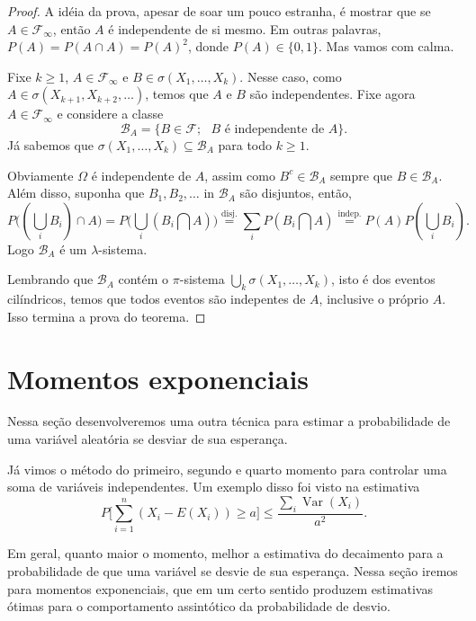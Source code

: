 \documentclass[reqno]{article}
\newcommand*\1{\mathds{1}}
\DeclareMathOperator{\Var}{Var}
\newcommand{\mcup}{\textstyle \bigcup\limits}
\newcommand{\mcap}{\textstyle \bigcap\limits}
\begin{document}
\begin{proof}
  A idéia da prova, apesar de soar um pouco estranha, é mostrar que se $A \in \mathcal{F}_\infty$, então $A$ é independente de si mesmo.
  Em outras palavras, $P(A) = P(A \cap A) = P(A)^2$, donde $P(A) \in \{0,1\}$.
  Mas vamos com calma.

  Fixe $k \geq 1$, $A \in \mathcal{F}_\infty$ e $B \in \sigma(X_1, \dots, X_k)$.
  Nesse caso, como $A \in \sigma(X_{k+1}, X_{k+2}, \dots)$, temos que $A$ e $B$ são independentes.
  Fixe agora $A \in \mathcal{F}_\infty$ e considere a classe
  \begin{equation}
    \mathcal{B}_A = \{B \in \mathcal{F}; \text{ $B$ é independente de $A$}\}.
  \end{equation}
  Já sabemos que $\sigma(X_1, \dots, X_k) \subseteq \mathcal{B}_A$ para todo $k \geq 1$.

  Obviamente $\Omega$ é independente de $A$, assim como $B^c \in \mathcal{B}_A$ sempre que $B \in \mathcal{B}_A$.
  Além disso, suponha que $B_1, B_2, \dots$ in $\mathcal{B}_A$ são disjuntos, então,
  \begin{equation*}
    P\big( (\mcup_i B_i) \cap A \big) = P\big( \mcup_i (B_i \mcap A) \big) \overset{\text{disj.}}= \sum_i P(B_i \mcap A) \overset{\text{indep.}}= P(A) P(\mcup_i B_i).
  \end{equation*}
  Logo $\mathcal{B}_A$ é um $\lambda$-sistema.

  Lembrando que $\mathcal{B}_A$ contém o $\pi$-sistema $\bigcup_k \sigma(X_1, \dots, X_k)$, isto é dos eventos cilíndricos, temos que todos eventos são indepentes de $A$, inclusive o próprio $A$.
  Isso termina a prova do teorema.
\end{proof}

\section{Momentos exponenciais}

Nessa seção desenvolveremos uma outra técnica para estimar a probabilidade de uma variável aleatória se desviar de sua esperança.

Já vimos o método do primeiro, segundo e quarto momento para controlar uma soma de variáveis independentes.
Um exemplo disso foi visto na estimativa
\begin{equation}
  P\Big[ \sum_{i=1}^n (X_i - E(X_i)) \geq a \Big] \leq \frac{\sum_i \Var (X_i)}{a^2}.
\end{equation}

Em geral, quanto maior o momento, melhor a estimativa do decaimento para a probabilidade de que uma variável se desvie de sua esperança.
Nessa seção iremos para momentos exponenciais, que em um certo sentido produzem estimativas ótimas para o comportamento assintótico da probabilidade de desvio.
\end{document}
